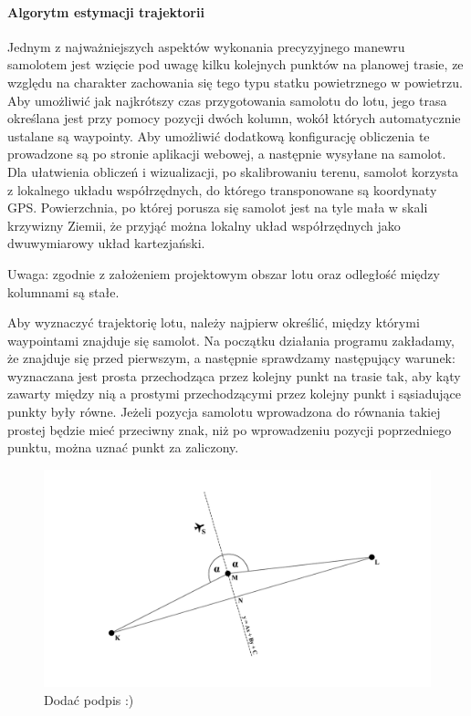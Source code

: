 \documentclass[12pt, a4paper]{article}
\begin{document}
\FloatBarrier
\paragraph{Algorytm estymacji trajektorii}\mbox{}

Jednym z najważniejszych aspektów wykonania precyzyjnego manewru samolotem jest wzięcie pod uwagę kilku kolejnych punktów na planowej trasie, ze względu na charakter zachowania się tego typu statku powietrznego w powietrzu. Aby umożliwić jak najkrótszy czas przygotowania samolotu do lotu, jego trasa określana jest przy pomocy pozycji dwóch kolumn, wokół których automatycznie ustalane są waypointy. Aby umożliwić dodatkową konfigurację obliczenia te prowadzone są po stronie aplikacji webowej, a następnie wysyłane na samolot. Dla ułatwienia obliczeń i wizualizacji, po skalibrowaniu terenu, samolot korzysta z lokalnego układu współrzędnych, do którego transponowane są koordynaty GPS. Powierzchnia, po której porusza się samolot jest na tyle mała w skali krzywizny Ziemii, że przyjąć można lokalny układ współrzędnych jako dwuwymiarowy układ kartezjański. 

Uwaga: zgodnie z założeniem projektowym obszar lotu oraz odległość między kolumnami są stałe. 

Aby wyznaczyć trajektorię lotu, należy najpierw określić, między którymi waypointami znajduje się samolot. Na początku działania programu zakładamy, że znajduje się przed pierwszym, a następnie sprawdzamy następujący warunek: wyznaczana jest prosta przechodząca przez kolejny punkt na trasie tak, aby kąty zawarty między nią a prostymi przechodzącymi przez kolejny punkt i sąsiadujące punkty były równe. Jeżeli pozycja samolotu wprowadzona do równania takiej prostej będzie mieć przeciwny znak, niż po wprowadzeniu pozycji poprzedniego punktu, można uznać punkt za zaliczony. 

 \begin{figure}[ht]
    \centering
    \includegraphics[width=1\textwidth]{nextwaypoint}
    \caption{Dodać podpis :)}
\end{figure}
\end{document}
